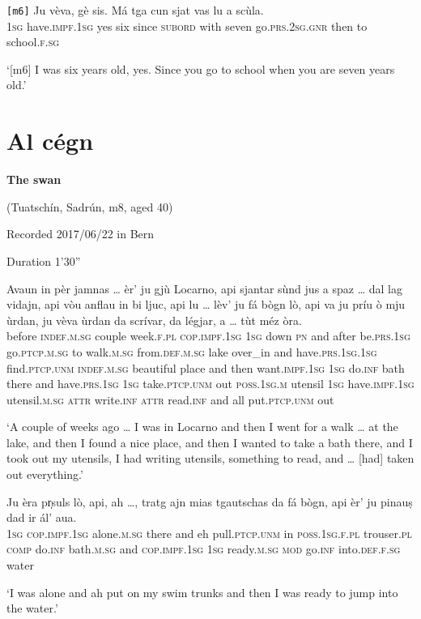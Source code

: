 \begin{linenumbers}
	\gll    \texttt{[m6]} Ju vèva, gè sis. Má tga cun sjat vas lu a scùla.\\
	{} \textsc{1sg}  have.\textsc{impf.1sg} yes six since  \textsc{subord} with seven go.\textsc{prs.2sg.gnr} then to school.\textsc{f.sg}\\
\end{linenumbers}
\medskip
\glt `[m6] I was six years old, yes. Since you go to school when you are seven years old.'
\medskip


\section{Al cégn}\label{sec:8.12}
\textbf{The swan}

\noindent
(Tuatschín, Sadrún, m8, aged 40)

\noindent
Recorded 2017/06/22 in Bern

\noindent
Duration 1'30''
\bigskip

\begin{linenumbers}
\gll  Avaun in pèr jamnas … èr’ ju gjù Locarno, api sjantar sùnd jus a spaz … dal lag vidajn, api vòu anflau in bi ljuc, api lu … lèv’ ju fá bògn lò, api va ju príu ò mju ùrdan, ju vèva ùrdan da scrívar, da légjar, a … tùt méz òra.\\
before \textsc{indef.m.sg} couple week.\textsc{f.pl} {} \textsc{cop.impf.1sg} \textsc{1sg} down \textsc{pn} and after be.\textsc{prs.1sg} go.\textsc{ptcp.m.sg} to walk.\textsc{m.sg} {} from.\textsc{def.m.sg} lake over\_in and have.\textsc{prs.1sg.1sg} find.\textsc{ptcp.unm} \textsc{indef.m.sg} beautiful place and then {} want.\textsc{impf.1sg} \textsc{1sg} do.\textsc{inf} bath there and have.\textsc{prs.1sg} \textsc{1sg} take.\textsc{ptcp.unm} out \textsc{poss.1sg.m} utensil \textsc{1sg} have.\textsc{impf.1sg} utensil.\textsc{m.sg} \textsc{attr} write.\textsc{inf} \textsc{attr} read.\textsc{inf} and {} all put.\textsc{ptcp.unm} out  \\
\end{linenumbers}
\medskip
\glt `A couple of weeks ago … I was in Locarno and then I went for a walk … at the lake, and then I found a nice place, and then I wanted to take a bath there, and I took out my utensils, I had writing utensils, something to read, and … [had] taken out everything.'
\medskip

\begin{linenumbers}
\gll  Ju èra pr̩suls lò, api, ah …, tratg ajn mias tgautschas da fá bògn, api èr’ ju pinauṣ dad ir ál’ aua.  \\
 \textsc{1sg} \textsc{cop.impf.1sg} alone.\textsc{m.sg} there and eh {} pull.\textsc{ptcp.unm} in \textsc{poss.1sg.f.pl} trouser.\textsc{pl} \textsc{comp} do.\textsc{inf} bath.\textsc{m.sg} and \textsc{cop.impf.1sg} \textsc{1sg} ready.\textsc{m.sg} \textsc{mod} go.\textsc{inf} into.\textsc{def.f.sg} water\\
\end{linenumbers}
\medskip
\glt `I was alone and ah put on my swim trunks and then I was ready to jump into the water.'
\medskip

